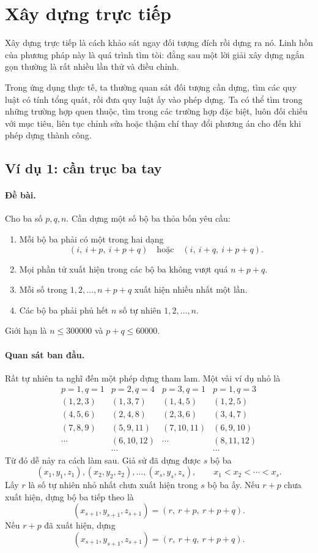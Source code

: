 \documentclass[11pt]{article}
\begin{document}
\section{Xây dựng trực tiếp}

Xây dựng trực tiếp là cách khảo sát ngay đối tượng đích rồi dựng ra nó. Linh
hồn của phương pháp này là quá trình tìm tòi: đằng sau một lời giải xây dựng
ngắn gọn thường là rất nhiều lần thử và điều chỉnh.

Trong ứng dụng thực tế, ta thường quan sát đối tượng cần dựng, tìm các quy
luật có tính tổng quát, rồi đưa quy luật ấy vào phép dựng. Ta có thể tìm trong
những trường hợp quen thuộc, tìm trong các trường hợp đặc biệt, luôn đối chiếu
với mục tiêu, liên tục chỉnh sửa hoặc thậm chí thay đổi phương án cho đến khi
phép dựng thành công.

\subsection{Ví dụ 1: cần trục ba tay}

\paragraph{Đề bài.}
Cho ba số $p,q,n$. Cần dựng một số bộ ba thỏa bốn yêu cầu:
\begin{enumerate}
  \item Mỗi bộ ba phải có một trong hai dạng
  \[
    (i,\ i+p,\ i+p+q)\quad\text{hoặc}\quad
    (i,\ i+q,\ i+p+q).
  \]
  \item Mọi phần tử xuất hiện trong các bộ ba không vượt quá $n+p+q$.
  \item Mỗi số trong $1,2,\ldots,n+p+q$ xuất hiện nhiều nhất một lần.
  \item Các bộ ba phải phủ hết $n$ số tự nhiên $1,2,\ldots,n$.
\end{enumerate}
Giới hạn là $n\le 300000$ và $p+q\le 60000$.

\paragraph{Quan sát ban đầu.}
Rất tự nhiên ta nghĩ đến một phép dựng tham lam. Một vài ví dụ nhỏ là
\[
\begin{array}{c|c|c|c}
p=1,q=1 & p=2,q=4 & p=3,q=1 & p=1,q=3\\ \hline
(1,2,3) & (1,3,7) & (1,4,5) & (1,2,5)\\
(4,5,6) & (2,4,8) & (2,3,6) & (3,4,7)\\
(7,8,9) & (5,9,11) & (7,10,11) & (6,9,10)\\
\cdots & (6,10,12) & \cdots & (8,11,12)\\
& \cdots & & \cdots
\end{array}
\]
Từ đó dễ nảy ra cách làm sau. Giả sử đã dựng được $s$ bộ ba
\[
  (x_1,y_1,z_1),(x_2,y_2,z_2),\ldots,(x_s,y_s,z_s),
  \qquad x_1<x_2<\cdots<x_s.
\]
Lấy $r$ là số tự nhiên nhỏ nhất chưa xuất hiện trong $s$ bộ ba ấy.
Nếu $r+p$ chưa xuất hiện, dựng bộ ba tiếp theo là
\[
  (x_{s+1},y_{s+1},z_{s+1})=(r,\ r+p,\ r+p+q).
\]
Nếu $r+p$ đã xuất hiện, dựng
\[
  (x_{s+1},y_{s+1},z_{s+1})=(r,\ r+q,\ r+p+q).
\]
\end{document}
